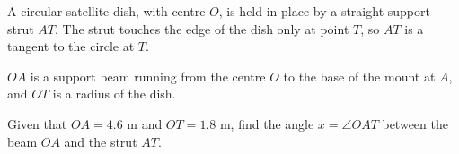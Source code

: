 \begin{question}
\noindent A circular satellite dish, with centre $O$, is held in place by a straight support strut $AT$. The strut touches the edge of the dish only at point $T$, so $AT$ is a tangent to the circle at $T$.

\noindent $OA$ is a support beam running from the centre $O$ to the base of the mount at $A$, and $OT$ is a radius of the dish.

\noindent Given that $OA = 4.6$ m and $OT = 1.8$ m, find the angle $x = \angle OAT$ between the beam $OA$ and the strut $AT$.

\begin{center}
\end{center}

\vspace{4cm}
\begin{flushright}
\end{flushright}
\end{question}